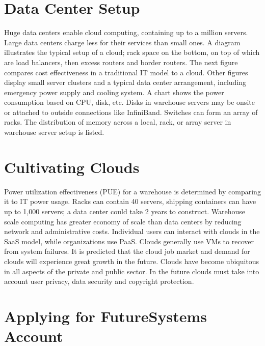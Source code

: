 
\section{Data Center Setup}

Huge data centers enable cloud computing, containing up to a million
servers. Large data centers charge less for their services than small
ones. A diagram illustrates the typical setup of a cloud; rack space on
the bottom, on top of which are load balancers, then excess routers and
border routers. The next figure compares cost effectiveness in a
traditional IT model to a cloud. Other figures display small server
clusters and a typical data center arrangement, including emergency
power supply and cooling system. A chart shows the power consumption
based on CPU, disk, etc. Disks in warehouse servers may be onsite or
attached to outside connections like InfiniBand. Switches can form an
array of racks. The distribution of memory across a local, rack, or
array server in warehouse server setup is listed.


\section{Cultivating Clouds}

Power utilization effectiveness (PUE) for a warehouse is determined by
comparing it to IT power usage. Racks can contain 40 servers, shipping
containers can have up to 1,000 servers; a data center could take 2
years to construct. Warehouse scale computing has greater economy of
scale than data centers by reducing network and administrative costs.
Individual users can interact with clouds in the SaaS model, while
organizations use PaaS. Clouds generally use VMs to recover from system
failures. It is predicted that the cloud job market and demand for
clouds will experience great growth in the future. Clouds have become
ubiquitous in all aspects of the private and public sector. In the
future clouds must take into account user privacy, data security and
copyright protection.


\section{Applying for FutureSystems Account}

